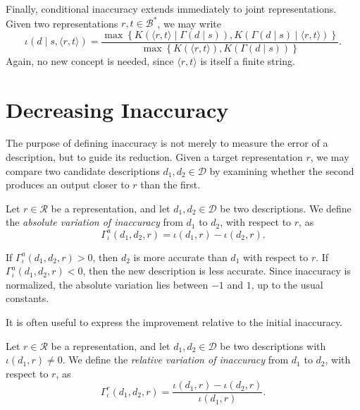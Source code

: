 Finally, conditional inaccuracy extends immediately to joint representations. Given two representations \(r,t \in \mathcal B^\ast\), we may write
\[
\iota(d \mid s,\langle r,t\rangle)
=
\frac{
\max\left\{
K \left(\langle r,t\rangle \mid \Gamma(d \mid s) \right),
K \left( \Gamma(d \mid s) \mid \langle r,t\rangle \right)
\right\}
}{
\max\left\{
K(\langle r,t\rangle),
K \left(\Gamma(d \mid s) \right)
\right\}
}.
\]
Again, no new concept is needed, since \(\langle r,t\rangle\) is itself a finite string.

%
%

\section{Decreasing Inaccuracy}
\label{sec:decreasing_inaccuracy}

The purpose of defining inaccuracy is not merely to measure the error of a description, but to guide its reduction. Given a target representation \(r\), we may compare two candidate descriptions \(d_1,d_2\in\mathcal D\) by examining whether the second produces an output closer to \(r\) than the first.

\begin{definition}
Let \(r \in \mathcal{R}\) be a representation, and let \(d_1,d_2\in\mathcal D\) be two descriptions. We define the \emph{absolute variation of inaccuracy} from \(d_1\) to \(d_2\), with respect to \(r\), as
\[
\Gamma_{\iota}^{a}(d_1,d_2,r)
=
\iota(d_1,r)-\iota(d_2,r).
\]
\end{definition}

If \(\Gamma_{\iota}^{a}(d_1,d_2,r)>0\), then \(d_2\) is more accurate than \(d_1\) with respect to \(r\). If \(\Gamma_{\iota}^{a}(d_1,d_2,r)<0\), then the new description is less accurate. Since inaccuracy is normalized, the absolute variation lies between \(-1\) and \(1\), up to the usual constants.

It is often useful to express the improvement relative to the initial inaccuracy.

\begin{definition}
Let $r \in \mathcal{R}$ be a representation, and let \(d_1,d_2\in\mathcal D\) be two descriptions with \(\iota(d_1,r)\neq 0\). We define the \emph{relative variation of inaccuracy} from \(d_1\) to \(d_2\), with respect to \(r\), as
\[
\Gamma_{\iota}^{r}(d_1,d_2,r)
=
\frac{\iota(d_1,r)-\iota(d_2,r)}
{\iota(d_1,r)}.
\]
\end{definition}

